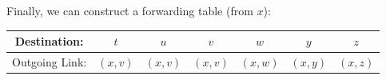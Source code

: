 \begin{enumerate}
    Finally, we can construct a forwarding table (from $x$):

    \begin{center}
      \begin{tabular}[h]{|c|c|c|c|c|c|c|}
        \hline
        Destination: & $t$ & $u$ & $v$ & $w$ & $y$ & $z$\\
        \hline
        Outgoing Link: & $(x,v)$ & $(x,v)$ & $(x,v)$ & $(x,w)$ & $(x,y)$ & $(x,z)$ \\
        \hline
      \end{tabular}
    \end{center}

\end{enumerate}




